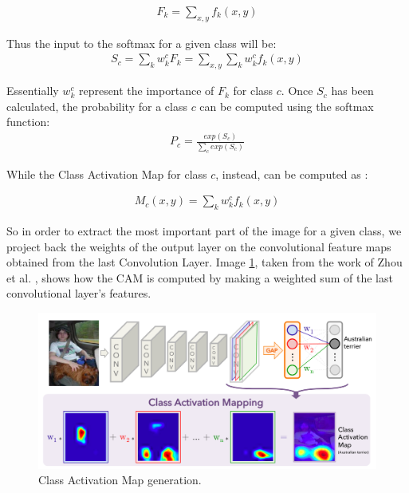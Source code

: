   \begin{equation}
  \label{eq:third_equation}
  \begin{gathered}
  F_{k} = \sum_{x,y} f_{k}(x,y)
  \end{gathered}  
  \end{equation}
  
\vspace{3mm}

\noindent Thus the input to the softmax for a given class will be:
 \begin{equation}
  \label{eq:fourth_equation}
  \begin{gathered}
  S_{c} = \sum_{k} w_{k}^{c} F_{k} = \sum_{x,y} \sum_{k} w_{k}^{c} f_{k}(x,y)
  \end{gathered}  
  \end{equation}
  
\vspace{3mm}

\noindent Essentially $w_{k}^{c}$ represent the importance of $F_{k}$ for class $c$. Once $S_{c}$ has been calculated, the probability for a class $c$ can be computed using the softmax function: 
\begin{equation}
\label{eq:fifth_equation}
\begin{gathered}
P_{c} = \frac{exp(S_{c})}{\sum_{c} exp(S_{c})}
\end{gathered}  
\end{equation}
\vspace{3mm}

\noindent While the Class Activation Map for class $c$, instead, can be computed as : 

  \begin{equation}
\label{eq:sixth_equation}
\begin{gathered}
M_{c}(x,y) = \sum _{k} w_{k}^{c} f_{k}(x,y)
\end{gathered}  
\end{equation}
  
\noindent So in order to extract the most important part of the image for a given class, we project back the weights of the output layer on the convolutional feature maps obtained from the last Convolution Layer. Image \ref{fig:ninth_figure}, taken from the work of Zhou et al. \cite{cam_paper}, shows how the \ac{CAM} is computed by making a weighted sum of the last convolutional layer's features.

\begin{figure}[htbp!]
\centering
\includegraphics[scale=0.35]{Tesi/images/Class Activation Map}
\caption{Class Activation Map generation.}
\label{fig:ninth_figure}
\end{figure}

